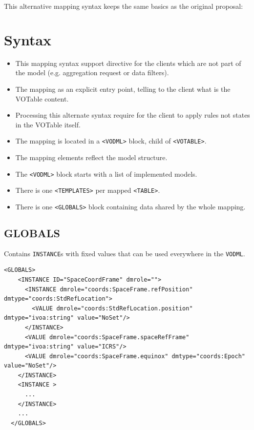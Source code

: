 \documentclass[11pt,a4paper]{ivoa}
\begin{document}
This alternative mapping syntax keeps the same basics as the original proposal:

\section{Syntax}

\begin{itemize}
	\item This mapping syntax support directive for the clients which are not part of the model (e.g. aggregation request or data filters).
	\item The mapping as an explicit entry point, telling to the client what is the VOTable content.
	\item Processing this alternate syntax require for the client to apply rules not states in the VOTable itself.
\end{itemize}

\begin{itemize}
    \item The mapping is located in a \texttt{<VODML>} block, child of \texttt{<VOTABLE>}.
    \item The mapping elements reflect the model structure.
    \item The \texttt{<VODML>} block starts with a list of implemented models.
    \item There is one \texttt{<TEMPLATES>} per mapped \texttt{<TABLE>}.
    \item There is one \texttt{<GLOBALS>} block containing data shared by the whole mapping.
\end{itemize}

\subsection{GLOBALS}

Contains  \texttt{INSTANCE}s with fixed values that can be used everywhere in the \texttt{VODML}.


\begin{lstlisting}[caption={INSTANCE bloc example},captionpos=b]
  <GLOBALS>
    <INSTANCE ID="SpaceCoordFrame" dmrole="">
      <INSTANCE dmrole="coords:SpaceFrame.refPosition" dmtype="coords:StdRefLocation">
        <VALUE dmrole="coords:StdRefLocation.position" dmtype="ivoa:string" value="NoSet"/>
      </INSTANCE>
      <VALUE dmrole="coords:SpaceFrame.spaceRefFrame" dmtype="ivoa:string" value="ICRS"/>
      <VALUE dmrole="coords:SpaceFrame.equinox" dmtype="coords:Epoch" value="NoSet"/>
    </INSTANCE>
    <INSTANCE >
      ... 
    </INSTANCE>
    ...
  </GLOBALS>
\end{lstlisting}
\end{document}
